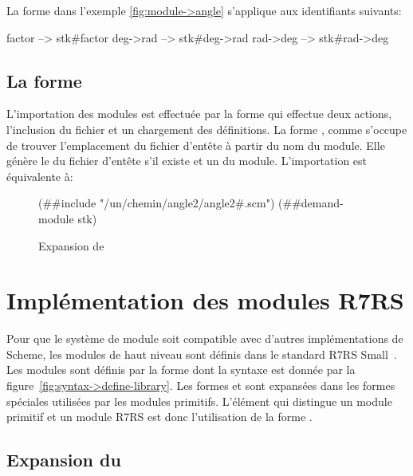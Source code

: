 La forme  dans l'exemple \ref{fig:module->angle}
s'applique aux identifiants suivants:
\begin{center}
  \begin{mplisting}{0.3}
factor    --> stk#factor
deg->rad  --> stk#deg->rad
rad->deg  --> stk#rad->deg
\end{mplisting}
\end{center}

\subsection{La forme }
%
L'importation des modules est effectuée par la forme  qui
effectue deux actions, l'inclusion du fichier  et un
chargement des définitions.  La forme , comme
 s'occupe de trouver l'emplacement du fichier d'entête
à partir du nom du module. Elle génère le  du fichier
d'entête s'il existe et un  du module.  L'importation
 est équivalente à:\\
\begin{figure}[ht]
  \centering
  \begin{mplisting}{0.9}
(##include "/un/chemin/angle2/angle2#.scm")
(##demand-module stk)
\end{mplisting}
  \caption{Expansion de }
  \label{fig:prim-import->stk}
\end{figure}


\section{Implémentation des modules R7RS}

Pour que le système de module soit compatible avec d'autres implémentations
de Scheme,  les modules de haut niveau sont définis dans le standard R7RS
Small~\cite{Scheme:R7RS}. Les modules sont définis par la forme
 dont la syntaxe est donnée par la
figure~\ref{fig:syntax->define-library}. Les formes  et
 sont expansées dans les formes spéciales utilisées par les modules
primitifs. L'élément qui distingue un module primitif et un module R7RS
est donc l'utilisation de la forme .

\subsection{Expansion du }
\label{sec:import-expand}

